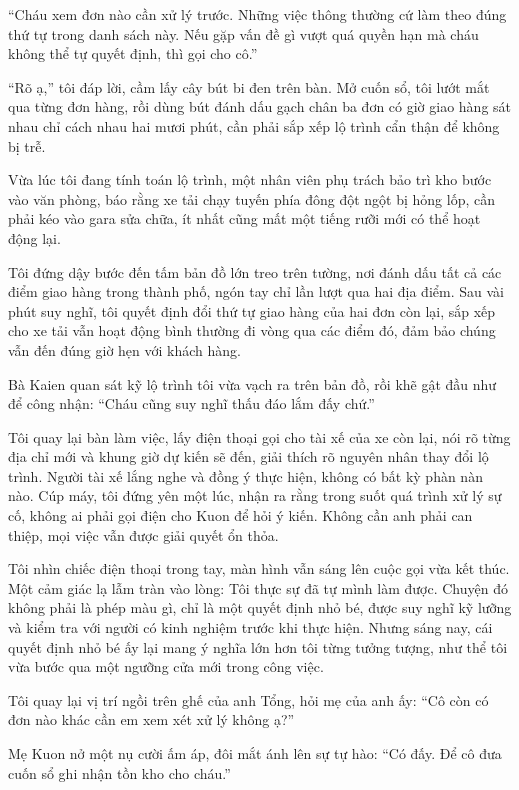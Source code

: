 \documentclass[../main.tex]{subfiles}
\begin{document}
``Cháu xem đơn nào cần xử lý trước. Những việc thông thường cứ làm theo đúng thứ tự trong danh sách này. Nếu gặp vấn đề gì vượt quá quyền hạn mà cháu không thể tự quyết định, thì gọi cho cô.''

``Rõ ạ,'' tôi đáp lời, cầm lấy cây bút bi đen trên bàn. Mở cuốn sổ, tôi lướt mắt qua từng đơn hàng, rồi dùng bút đánh dấu gạch chân ba đơn có giờ giao hàng sát nhau chỉ cách nhau hai mươi phút, cần phải sắp xếp lộ trình cẩn thận để không bị trễ.

Vừa lúc tôi đang tính toán lộ trình, một nhân viên phụ trách bảo trì kho bước vào văn phòng, báo rằng xe tải chạy tuyến phía đông đột ngột bị hỏng lốp, cần phải kéo vào gara sửa chữa, ít nhất cũng mất một tiếng rưỡi mới có thể hoạt động lại. 

Tôi đứng dậy bước đến tấm bản đồ lớn treo trên tường, nơi đánh dấu tất cả các điểm giao hàng trong thành phố, ngón tay chỉ lần lượt qua hai địa điểm. Sau vài phút suy nghĩ, tôi quyết định đổi thứ tự giao hàng của hai đơn còn lại, sắp xếp cho xe tải vẫn hoạt động bình thường đi vòng qua các điểm đó, đảm bảo chúng vẫn đến đúng giờ hẹn với khách hàng.

Bà Kaien quan sát kỹ lộ trình tôi vừa vạch ra trên bản đồ, rồi khẽ gật đầu như để công nhận: ``Cháu cũng suy nghĩ thấu đáo lắm đấy chứ.''

Tôi quay lại bàn làm việc, lấy điện thoại gọi cho tài xế của xe còn lại, nói rõ từng địa chỉ mới và khung giờ dự kiến sẽ đến, giải thích rõ nguyên nhân thay đổi lộ trình. Người tài xế lắng nghe và đồng ý thực hiện, không có bất kỳ phàn nàn nào. Cúp máy, tôi đứng yên một lúc, nhận ra rằng trong suốt quá trình xử lý sự cố, không ai phải gọi điện cho Kuon để hỏi ý kiến. Không cần anh phải can thiệp, mọi việc vẫn được giải quyết ổn thỏa.

Tôi nhìn chiếc điện thoại trong tay, màn hình vẫn sáng lên cuộc gọi vừa kết thúc. Một cảm giác lạ lẫm tràn vào lòng: Tôi thực sự đã tự mình làm được. Chuyện đó không phải là phép màu gì, chỉ là một quyết định nhỏ bé, được suy nghĩ kỹ lưỡng và kiểm tra với người có kinh nghiệm trước khi thực hiện. Nhưng sáng nay, cái quyết định nhỏ bé ấy lại mang ý nghĩa lớn hơn tôi từng tưởng tượng, như thể tôi vừa bước qua một ngưỡng cửa mới trong công việc.

Tôi quay lại vị trí ngồi trên ghế của anh Tổng, hỏi mẹ của anh ấy: ``Cô còn có đơn nào khác cần em xem xét xử lý không ạ?''

Mẹ Kuon nở một nụ cười ấm áp, đôi mắt ánh lên sự tự hào: ``Có đấy. Để cô đưa cuốn sổ ghi nhận tồn kho cho cháu.''
\end{document}
